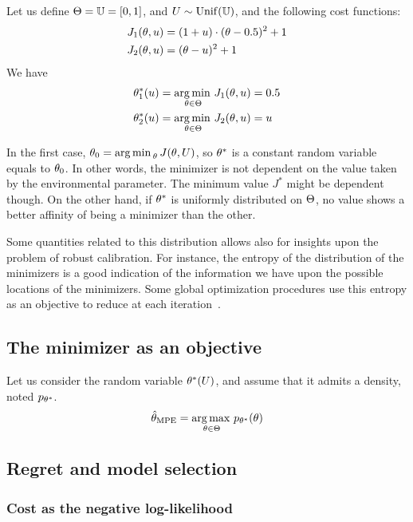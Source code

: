 \documentclass[../../Main_ManuscritThese.tex]{subfiles}
\begin{document}
Let us define $\Theta = \mathbb{U}= [0, 1]$, and $U \sim \mathrm{Unif}(\mathbb{U})$, and the following cost functions:
\begin{align}
  J_1(\theta, u) &= (1+u)\cdot(\theta - 0.5)^2 + 1\\
  J_2(\theta, u) &= (\theta-u)^2 + 1
\end{align}
We have
\begin{align}
  \theta^*_1(u) &= \operatorname*{arg\,min \,}_{\theta \in \Theta} J_1(\theta, u) = 0.5 \\
  \theta^*_2(u) &= \operatorname*{arg\,min \,}_{\theta\in\Theta} J_2(\theta, u) = u
\end{align}

In the first case, $\theta_0 = \operatorname*{arg\,min \,}_{\theta} J(\theta, U)$, so $\theta^*$ is a constant random variable equals to  $\theta_0$. In other words, the minimizer is not dependent on the value taken by the environmental parameter. The minimum value $J^*$ might be dependent though. On the other hand, if $\theta^*$ is uniformly distributed on $\Theta$, no value shows a better affinity of being a minimizer than the other.


Some quantities related to this distribution allows also for insights upon the problem of robust calibration. For instance, the entropy of the distribution of the minimizers is a good indication of the information we have upon the possible locations of the minimizers. Some global optimization procedures use this entropy as an objective to reduce at each iteration~\cite{villemonteix_informational_2006}.

\subsection{The minimizer as an objective}
Let us consider the random variable $\theta^*(U)$, and assume that it admits a density, noted $p_{\theta^*}$.
\begin{equation}
  \hat{\theta}_{\mathrm{MPE}} = \operatorname*{arg\,max \,}_{\theta \in \Theta} p_{\theta^*}(\theta)
\end{equation}



\subsection{Regret and model selection}

\subsubsection{Cost as the negative log-likelihood}
\end{document}
